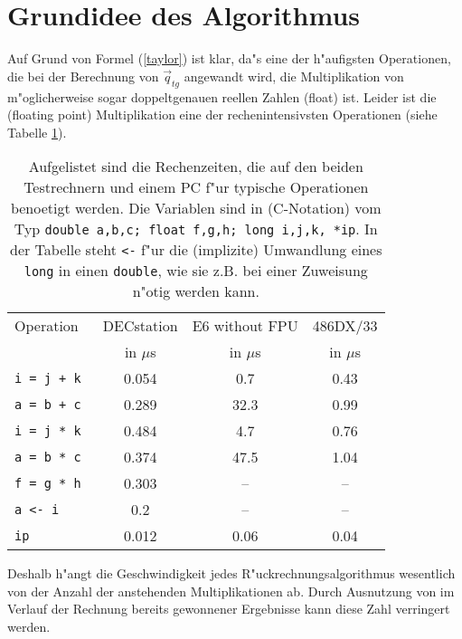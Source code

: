 \section{Grundidee des Algorithmus}
Auf Grund von Formel (\ref{taylor}) ist klar, da"s eine der 
h"aufigsten Operationen,
die bei der Berechnung von $ \vec{q}_{tg} $ angewandt wird, die 
Multiplikation
von m"oglicherweise sogar doppeltgenauen reellen Zahlen (float) ist. 
Leider ist die (floating point) Multiplikation
eine der rechenintensivsten Operationen (siehe Tabelle \ref{benchops}). 
\begin{table}
\begin{center}
\begin{tabular}{|l|c|c|c|}
\hline
Operation & DECstation & E6 without FPU  & 486DX/33\\
          & in $\mu$s  & in $\mu$s  & in $\mu$s \\    
\hline
\tt  i = j + k   &     0.054  &       0.7   & 0.43 \\
\tt  a = b + c   &     0.289  &      32.3   & 0.99 \\
\tt  i = j * k   &     0.484  &      4.7    & 0.76 \\
\tt  a = b * c   &     0.374  &     47.5    & 1.04 \\
\tt  f = g * h   &     0.303  &      --     & --   \\
\tt  a <- i      &     0.2    &      --     & --   \\
\tt  *ip         &     0.012  &      0.06   & 0.04\\  
\hline 
\end{tabular}
\end{center}
\caption{
  Aufgelistet sind die Rechenzeiten, die auf den beiden Testrechnern
  und einem PC f"ur typische Operationen benoetigt werden. Die Variablen
  sind in (C-Notation) vom Typ {\tt double a,b,c; float f,g,h; 
   long i,j,k, *ip}.
  In der Tabelle  steht {\tt <-} f"ur die (implizite) Umwandlung 
  eines {\tt long} in einen
  {\tt double}, wie sie z.B. bei einer Zuweisung n"otig werden kann.
}
\label{benchops}
\end{table}
Deshalb h"angt
die Geschwindigkeit jedes R"uckrechnungsalgorithmus wesentlich von der Anzahl der
anstehenden Multiplikationen ab. 
Durch Ausnutzung von im Verlauf der Rechnung bereits gewonnener
Ergebnisse kann diese Zahl verringert werden.
